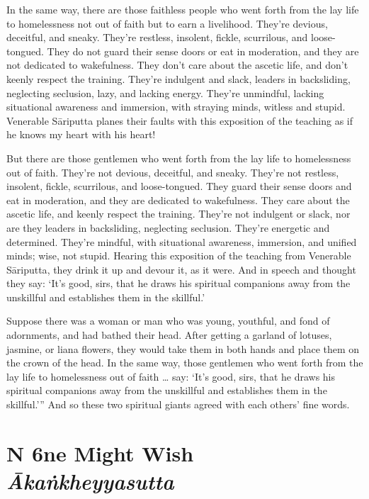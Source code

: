 \documentclass[12pt,openany]{book}%
\newcommand*{\suttatitleacronym}[1]{\smaller[2]{#1}\vspace*{.3em}}
\newcommand*{\suttatitletranslation}[1]{\linebreak{#1}}
\newcommand*{\suttatitleroot}[1]{\linebreak\smaller[2]\itshape{#1}}
\newcommand*{\tocacronym}[1]{\hspace*{-3.3em}{#1}\quad}
\newcommand*{\toctranslation}[1]{#1}
\newcommand*{\tocroot}[1]{(\textit{#1})}
\begin{document}
In the same way, there are those faithless people who went forth from the lay life to homelessness not out of faith but to earn a livelihood. They’re devious, deceitful, and sneaky. They’re restless, insolent, fickle, scurrilous, and loose-tongued. They do not guard their sense doors or eat in moderation, and they are not dedicated to wakefulness. They don’t care about the ascetic life, and don’t keenly respect the training. They’re indulgent and slack, leaders in backsliding, neglecting seclusion, lazy, and lacking energy. They’re unmindful, lacking situational awareness and immersion, with straying minds, witless and stupid. Venerable \textsanskrit{Sāriputta} planes their faults with this exposition of the teaching as if he knows my heart with his heart! 

But there are those gentlemen who went forth from the lay life to homelessness out of faith. They’re not devious, deceitful, and sneaky. They’re not restless, insolent, fickle, scurrilous, and loose-tongued. They guard their sense doors and eat in moderation, and they are dedicated to wakefulness. They care about the ascetic life, and keenly respect the training. They’re not indulgent or slack, nor are they leaders in backsliding, neglecting seclusion. They’re energetic and determined. They’re mindful, with situational awareness, immersion, and unified minds; wise, not stupid. Hearing this exposition of the teaching from Venerable \textsanskrit{Sāriputta}, they drink it up and devour it, as it were. And in speech and thought they say: ‘It’s good, sirs, that he draws his spiritual companions away from the unskillful and establishes them in the skillful.’ 

Suppose there was a woman or man who was young, youthful, and fond of adornments, and had bathed their head. After getting a garland of lotuses, jasmine, or liana flowers, they would take them in both hands and place them on the crown of the head. In the same way, those gentlemen who went forth from the lay life to homelessness out of faith … say: ‘It’s good, sirs, that he draws his spiritual companions away from the unskillful and establishes them in the skillful.’” And so these two spiritual giants agreed with each others’ fine words. 

%
\section*{{\suttatitleacronym MN 6}{\suttatitletranslation One Might Wish }{\suttatitleroot Ākaṅkheyyasutta}}
\addcontentsline{toc}{section}{\tocacronym{MN 6} \toctranslation{One Might Wish } \tocroot{Ākaṅkheyyasutta}}
\end{document}
